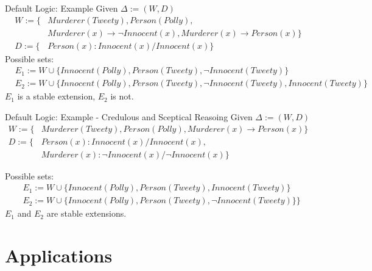 \documentclass[8pt]{beamer}
\newcommand{\myfootnote}[1]{
    \renewcommand{\thefootnote}{}
    \footnotetext{\hspace{-4pt}\scriptsize#1}
    \renewcommand{\thefootnote}{\arabic{footnote}}
}
\begin{document}
\begin{frame}{Default Logic: Example}
Given $\Delta:=(W,D)$
\begin{equation*}
\begin{split}
 W:= \{&Murderer(Tweety), Person(Polly), \\
&  Murderer(x) \to \neg Innocent(x), Murderer(x) \to  Person(x) \}\\
 D:=\{&Person(x):Innocent(x)/Innocent(x)\}
\end{split}
\end{equation*}
Possible sets:
\begin{equation*}
\begin{split}
&E_1:= W \cup \{Innocent(Polly), Person(Tweety), \neg Innocent(Tweety)\} \\
&E_2:= W \cup \{Innocent(Polly), Person(Tweety), \neg Innocent(Tweety), Innocent(Tweety)\}
\end{split}
\end{equation*}
$E_1$ is a stable extension, $E_2$ is not. 
\myfootnote{\cite{ANTONIOU2007517}}
\end{frame}



\begin{frame}{Default Logic: Example - Credulous and Sceptical Reasoing}
Given $\Delta:=(W,D)$
\begin{equation*}
\begin{split}
 W:= \{&Murderer(Tweety), Person(Polly),  Murderer(x) \to  Person(x) \}\\
 D:=\{&Person(x):Innocent(x)/Innocent(x), \\
 & Murderer(x): \neg Innocent(x)/\neg Innocent(x)\}
\end{split}
\end{equation*}

Possible sets:
\begin{equation*}
\begin{split}
&E_1:= W \cup \{Innocent(Polly), Person(Tweety), Innocent(Tweety)\}\\
&E_2:= W \cup \{Innocent(Polly), Person(Tweety), \neg Innocent(Tweety)\}\}
\end{split}
\end{equation*}
$E_1$ and $E_2$  are stable extensions. 
 
\myfootnote{\cite{nonmonoton_stanford2018,brewka1997nonmonotonic}}
\end{frame}

\section{Applications}
\end{document}
